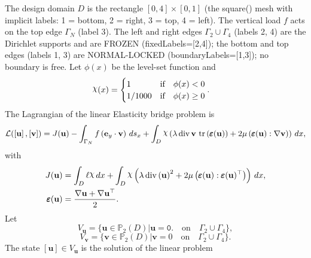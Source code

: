 \documentclass[preview]{standalone}
\let\oldcdot\cdot
\let\cdot\oldcdot
\begin{document}
The design domain $D$ is the rectangle $[0,4]\times[0,1]$ (the square() mesh with implicit labels: 1 = bottom, 2 = right, 3 = top, 4 = left).  The vertical load $f$ acts on the top edge $\Gamma_N$ (label 3).  The left and right edges $\Gamma_{2}\cup\Gamma_{4}$ (labels 2, 4) are the Dirichlet supports and are FROZEN (fixedLabels=[2,4]); the bottom and top edges (labels 1, 3) are NORMAL-LOCKED (boundaryLabels=[1,3]); no boundary is free.
Let $\phi(x)$ be the level-set function and
 \begin{align*}\raisebox{\depth}{$\chi$}(x) &= \begin{cases} 1 & \mbox{if}\quad \phi(x) < 0 \\ 1/1000 & \mbox{if}\quad \phi(x)  \ge 0 \end{cases}.\end{align*}
The Lagrangian of the linear Elasticity bridge problem is
\begin{dmath*}
\mathcal L(\left[ {\mathbf{ u }}\right],\left[ {\mathbf{ v }}\right]) = J({\mathbf{ u }}) -  \int_{\Gamma_N} f \left( \mathbf e_y \cdot {\mathbf{ v }} \right) \,ds_x +  \int_{D} \raisebox{\depth}{$\chi$} \left(\lambda \operatorname{div} {\mathbf{ v }}  \,\operatorname{tr}\left(\pmb \varepsilon({\mathbf{ u }})\right)  + 2 \mu \left( \pmb \varepsilon({\mathbf{ u }}) \mathrel{:}  \nabla {\mathbf{ v }}  \right)\right) \,dx , 
\end{dmath*}
with 
\begin{align*}
J({\mathbf{ u }}) &=  \int_{D} \ell \raisebox{\depth}{$\chi$} \,dx +  \int_{D} \raisebox{\depth}{$\chi$} \left(\lambda \operatorname{div}\left( {\mathbf{ u }} \right)^{2} + 2 \mu \left( \pmb \varepsilon({\mathbf{ u }}) \mathrel{:}  \pmb \varepsilon({\mathbf{ u }})^\top  \right)\right) \,dx,\\
\pmb \varepsilon({\mathbf{ u }}) &= \frac{ \nabla {\mathbf{ u }}  +   \nabla {\mathbf{ u }} ^\top }{2}.
 \end{align*}
Let
\begin{equation*}
V_{{\mathbf{ u }}} = \{ {\mathbf{ u }} \in \mathbb P_{2}(D)| {\mathbf{ u }} = \mathtt{\text{0.}}  \quad \text{{on}} \quad\Gamma_{2}\cup\Gamma_{4} \},\end{equation*}
\begin{equation*}
V_{{\mathbf{ v }}} = \{ {\mathbf{ v }} \in \mathbb P_{2}(D)| {\mathbf{ v }} = 0  \quad \text{{on}} \quad\Gamma_{2}\cup\Gamma_{4} \}.\end{equation*}
The state $\left[ {\mathbf{ u }}\right] \in  V_{{\mathbf{ u }}}$ is the solution of the linear problem
\end{document}
